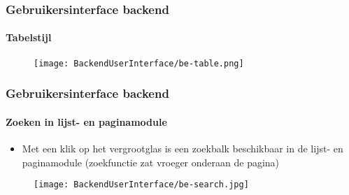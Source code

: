 
\begin{frame}[fragile]
	\frametitle{Gebruikersinterface backend}
	\framesubtitle{Tabelstijl}

	\begin{figure}
		\texttt{[image: BackendUserInterface/be-table.png]}
	\end{figure}

\end{frame}


\begin{frame}[fragile]
	\frametitle{Gebruikersinterface backend}
	\framesubtitle{Zoeken in lijst- en paginamodule}

	\begin{itemize}
		\item Met een klik op het vergrootglas is een zoekbalk beschikbaar in de lijst- en paginamodule\newline
			(zoekfunctie zat vroeger onderaan de pagina)
	\end{itemize}

	\begin{figure}
		\texttt{[image: BackendUserInterface/be-search.jpg]}
	\end{figure}

\end{frame}


